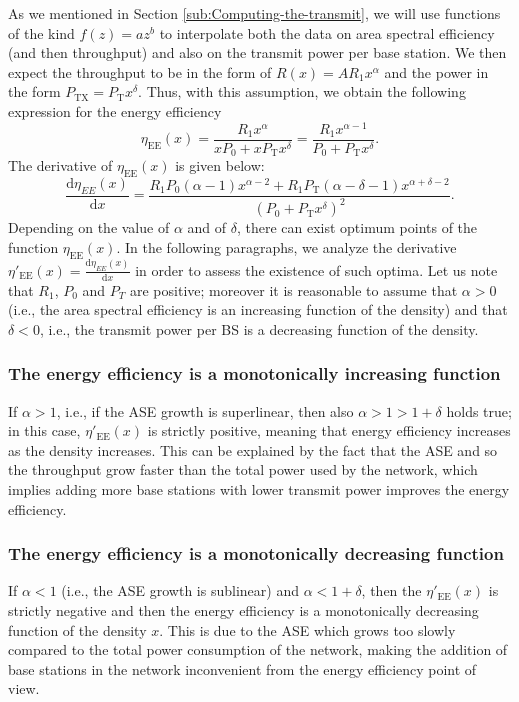 \documentclass[twocoumn]{IEEEtran}
\begin{document}
As we mentioned in Section \ref{sub:Computing-the-transmit}, we will use functions of the
kind $f(z)=az^{b}$ to interpolate both the data on area spectral
efficiency (and then throughput) and also on the transmit power per
base station. We then expect the throughput to be in the form of $R(x)=AR_{1}x^{\alpha}$
and the power in the form $P_{\mathrm{TX}}=P_{\mathrm{T}}x^{\delta}$.
Thus, with this assumption, we obtain the following expression for
the energy efficiency 
\begin{equation}
\eta_{\mathrm{EE}}(x)=\frac{R_{1}x^{\alpha}}{xP_{0}+xP_{\mathrm{T}}x^{\delta}}=\frac{R_{1}x^{\alpha-1}}{P_{0}+P_{\mathrm{T}}x^{\delta}}.\label{eq:eff_pathloss_2}
\end{equation}
The derivative of $\eta_{\mathrm{EE}}(x)$ is given below: 
$$
\frac{\mathrm{d}\eta_{EE}(x)}{\mathrm{d}x}=\frac{R_{1}P_{0}(\alpha-1)x^{\alpha-2}+R_{1}P_{\mathrm{T}}(\alpha-\delta-1)x^{\alpha+\delta-2}}{\left(P_{0}+P_{\mathrm{T}}x^{\delta}\right)^{2}}.
$$
Depending on the value of $\alpha$ and of $\delta$, there can exist optimum points of the function $\eta_{\mathrm{EE}}(x)$. In the following paragraphs, we analyze the derivative $\eta\prime_{\mathrm{EE}}(x)=\frac{\mathrm{d}\eta_{EE}(x)}{\mathrm{d}x}$ in order to assess the existence of such optima. Let us note that $R_{1}$, $P_{0}$ and $P_T$ are positive; moreover it is reasonable to assume that $\alpha>0$ (i.e., the area spectral efficiency is an increasing function of the density) and that $\delta<0$, i.e., the transmit power per BS is a decreasing function of the density.
\subsubsection{The energy efficiency is a monotonically increasing function}	If $\alpha>1$, i.e., if the ASE growth is superlinear, then also $\alpha>1>1+\delta$ holds true; in this case, $\eta\prime_{\mathrm{EE}}(x)$ is strictly positive, meaning that energy efficiency increases as the density increases. This can be explained by the fact that the ASE and so the throughput grow faster than the total power used by the network, which implies adding more base stations with lower transmit power improves the energy efficiency.
\subsubsection{The energy efficiency is a monotonically decreasing function}	If $\alpha<1$ (i.e., the ASE growth is sublinear) and $\alpha<1+\delta$, then the $\eta\prime_{\mathrm{EE}}(x)$ is strictly negative and then the energy efficiency is a monotonically decreasing function of the density $x$. This is due to the ASE which grows too slowly compared to the total power consumption of the network, making the addition of base stations in the network inconvenient from the energy efficiency point of view.
\end{document}
